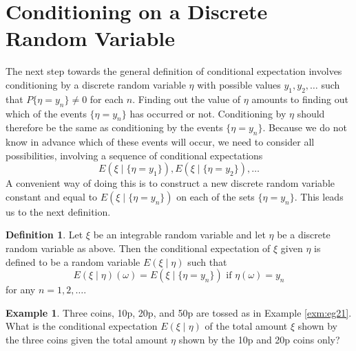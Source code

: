 \documentclass[
]{book}
\theoremstyle{definition}
\newtheorem{definition}{Definition}[chapter]
\theoremstyle{definition}
\newtheorem{example}{Example}[chapter]
\theoremstyle{definition}
\theoremstyle{definition}
\theoremstyle{remark}
\begin{document}
\section{Conditioning on a Discrete Random Variable}\label{conditioning-on-a-discrete-random-variable}

The next step towards the general definition of conditional expectation involves conditioning by a discrete random variable \(\eta\) with possible values \(y_1, y_2, \ldots\) such that \(P\{\eta = y_n\} \neq 0\) for each \(n\). Finding out the value of \(\eta\) amounts to finding out which of the events \(\{\eta = y_n\}\) has occurred or not. Conditioning by \(\eta\) should therefore be the same as conditioning by the events \(\{\eta = y_n\}\). Because we do not know in advance which of these events will occur, we need to consider all possibilities, involving a sequence of conditional expectations
\[
E(\xi \mid \{\eta = y_1\}), E(\xi \mid \{\eta = y_2\}), \ldots
\]
A convenient way of doing this is to construct a new discrete random variable constant and equal to \(E(\xi \mid \{\eta = y_n\})\) on each of the sets \(\{\eta = y_n\}\). This leads us to the next definition.

\begin{definition}
\protect\hypertarget{def:unnamed-chunk-45}{}\label{def:unnamed-chunk-45}Let \(\xi\) be an integrable random variable and let \(\eta\) be a discrete random variable as above. Then the conditional expectation of \(\xi\) given \(\eta\) is defined to be a random variable \(E(\xi \mid \eta)\) such that
\[
E(\xi \mid \eta)(\omega) = E(\xi \mid \{\eta = y_n\}) \text{ if } \eta(\omega) = y_n
\]
for any \(n = 1, 2, \ldots\).
\end{definition}

\begin{example}
\protect\hypertarget{exm:unnamed-chunk-46}{}\label{exm:unnamed-chunk-46}Three coins, 10p, 20p, and 50p are tossed as in Example \ref{exm:eg21}. What is the conditional expectation \(E(\xi \mid \eta)\) of the total amount \(\xi\) shown by the three coins given the total amount \(\eta\) shown by the 10p and 20p coins only?
\end{example}
\end{document}
